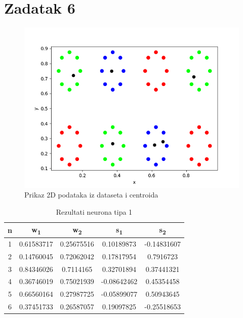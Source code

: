 \documentclass[times, utf8, seminar]{fer}
\begin{document}
\chapter{Zadatak 6}
\begin{figure}[H]
    \centering
    \includegraphics[scale=0.7]{img/zad_6.png}
    \caption[Caption for LOF]{Prikaz 2D podataka iz dataseta i centroida\footnotemark}
    \label{zad6:img}
\end{figure}

\begin{table}[H]
    \centering
    \begin{tabular}{|c c c c c|} 
        \hline
        n & w\textsubscript{1} & w\textsubscript{2} & s\textsubscript{1} & s\textsubscript{2} \\ [0.5ex] 
        \hline\hline
        \rowcolor{Blue}
        1 & 0.61583717 & 0.25675516 & 0.10189873 & -0.14831607 \\
        \rowcolor{Green}
        2 & 0.14760045 & 0.72062042 & 0.17817954 & 0.7916723 \\
        \rowcolor{Green}
        3 & 0.84346026 & 0.7114165 & 0.32701894 & 0.37441321 \\
        \rowcolor{Blue}
        4 & 0.36746019 & 0.75021939 & -0.08642462 & 0.45354458 \\
        \rowcolor{Blue}
        5 & 0.66560164 & 0.27987725 & -0.05899077 & 0.50943645 \\
        \rowcolor{Green}
        6 & 0.37451733 & 0.26587057 & 0.19097825 & -0.25518653 \\ [1ex]
        \hline
    \end{tabular}
    \caption{Rezultati neurona tipa 1}
    \label{zad6:table}
\end{table}



\nocite{*}
\end{document}
